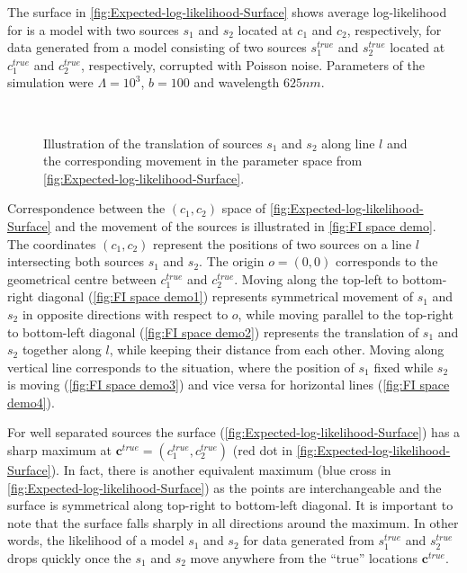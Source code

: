 The surface in \autoref{fig:Expected-log-likelihood-Surface} shows average log-likelihood for is a model with two sources $s_1$ and $s_2$ located at $c_1$ and $c_2$, respectively, for data generated from a model consisting of two sources $s_1^{true}$ and $s_2^{true}$ located at $c_1^{true}$ and $c_2^{true}$, respectively, corrupted with Poisson noise. Parameters of the simulation were $\Lambda=10^3$, $b=100$ and wavelength $625 \unit{nm}$.

\begin{figure}[hb]
	\newcommand{\wf}{.48\textwidth}
	\centering
	 \\
	\caption{Illustration of the translation of sources $s_1$ and $s_2$ along line $l$ and the corresponding movement in the parameter space from \autoref{fig:Expected-log-likelihood-Surface}.}
	\label{fig:FI space demo}
\end{figure}
%
Correspondence between the $(c_1,c_2)$ space of \autoref{fig:Expected-log-likelihood-Surface} and the movement of the sources is illustrated in \autoref{fig:FI space demo}. The coordinates $(c_1,c_2)$ represent the positions of two sources on a line $l$ intersecting both sources $s_1$ and  $s_2$. The origin $o=(0,0)$ corresponds to the geometrical centre between $c_1^{true}$ and $c_2^{true}$. Moving along the top-left to bottom-right diagonal (\autoref{fig:FI space demo1}) represents symmetrical movement of $s_1$ and $s_2$  in opposite directions with respect to $o$, while moving parallel to the top-right to bottom-left diagonal (\autoref{fig:FI space demo2}) represents the translation of $s_1$ and $s_2$ together along $l$, while keeping their distance from each other. Moving along vertical line corresponds to the situation, where the position of $s_1$ fixed while $s_2$ is moving (\autoref{fig:FI space demo3}) and vice versa for horizontal lines (\autoref{fig:FI space demo4}).

For well separated sources the surface (\autoref{fig:Expected-log-likelihood-Surface}\aaa) has a sharp maximum at $\bm{c}^{true}=(c_1^{true},c_2^{true})$ (red dot in \autoref{fig:Expected-log-likelihood-Surface}\aaa). In fact, there is another equivalent maximum (blue cross in \autoref{fig:Expected-log-likelihood-Surface}\aaa) as the points are interchangeable and the surface is symmetrical along top-right to bottom-left diagonal. It is important to note that the surface falls sharply in all directions around the maximum. In other words, the likelihood of a model $s_1$ and $s_2$ for data generated from $s_1^{true}$ and $s_2^{true}$ drops quickly once the $s_1$ and $s_2$ move anywhere from the ``true'' locations $\bm{c}^{true}$.

